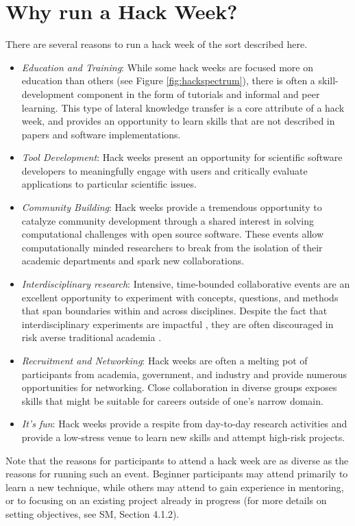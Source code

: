 \section*{Why run a Hack Week?}

There are several reasons to run a hack week of the sort described here.

\begin{itemize}
\item{\textit{Education and Training}:
While some hack weeks are focused more on education than others (see Figure \ref{fig:hackspectrum}), there is often a skill-development component in the form of tutorials and informal and peer learning. This type of lateral knowledge transfer is a core attribute of a hack week, and provides an opportunity to learn skills that are not described in papers and software implementations.}

\item{\textit{Tool Development}: Hack weeks present an opportunity for scientific software developers to meaningfully engage with users and critically evaluate applications to particular scientific issues.}

\item{\textit{Community Building}: Hack weeks provide a tremendous opportunity to catalyze community development through a shared interest in solving computational challenges with open source software. These events allow computationally minded researchers to break from the isolation of their academic departments and spark new collaborations.}


\item{\textit{Interdisciplinary research}: Intensive, time-bounded collaborative events are an excellent opportunity to experiment with concepts, questions, and methods that span boundaries within and across disciplines. Despite the fact that interdisciplinary experiments are impactful \cite{Hall2012-hi}, they are often discouraged in risk averse traditional academia \cite{Sung2003-go}}.

\item{\textit{Recruitment and Networking}: Hack weeks are often a melting pot of participants from academia, government, and industry and provide numerous opportunities for networking. Close collaboration in diverse groups exposes skills that might be suitable for careers outside of one's narrow domain.}

\item{\textit{It's fun}: Hack weeks provide a respite from day-to-day research activities and provide a low-stress venue to learn new skills and attempt high-risk projects.}

\end{itemize}

\noindent Note that the reasons for participants to attend a hack week are as diverse as the reasons for running such an event.
Beginner participants may attend primarily to learn a new technique, while others may attend to gain experience in mentoring, or to focusing on an existing project already in progress (for more details on setting objectives, see SM, Section 4.1.2).
